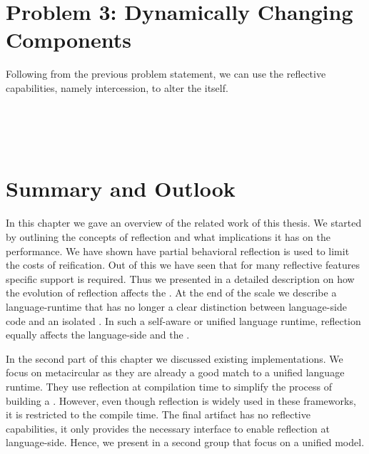 \section{Problem 3: Dynamically Changing \VM Components}
Following from the previous problem statement, we can use the reflective capabilities, namely intercession, to alter the \VM itself.

\\
\\
\\


\section{Summary and Outlook}

In this chapter we gave an overview of the related work of this thesis.
We started by outlining the concepts of reflection and what implications it has on the performance.
We have shown have partial behavioral reflection is used to limit the costs of reification.
Out of this we have seen that for many reflective features specific \VM support is required.
Thus we presented in  a detailed description on how the evolution of reflection affects the \VM.
At the end of the scale we describe a language-runtime that has no longer a clear distinction between language-side code and an isolated \VM.
In such a self-aware \VM or unified language runtime, reflection equally affects the language-side and the \VM.

In the second part of this chapter we discussed existing \VM implementations.
We focus on metacircular \VMs as they are already a good match to a unified language runtime.
They use reflection at compilation time to simplify the process of building a \VM.
However, even though reflection is widely used in these frameworks, it is restricted to the compile time.
The final \VM artifact has no reflective capabilities, it only provides the necessary interface to enable reflection at language-side.
Hence, we present in a second group \VMs that focus on a unified model.


